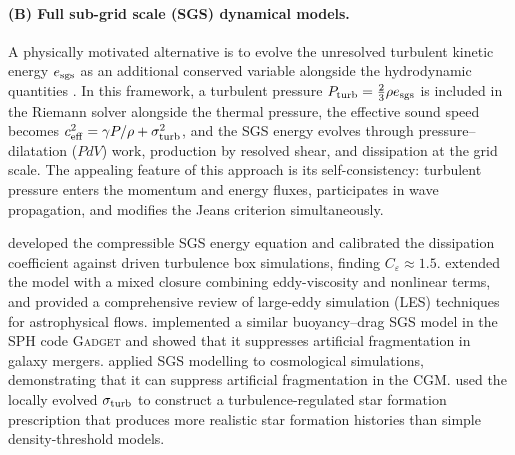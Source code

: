 \documentclass[fleqn,usenatbib]{mnras}
\begin{document}
\paragraph{(B) Full sub-grid scale (SGS) dynamical models.}
A physically motivated alternative is to evolve the unresolved
turbulent kinetic energy $e_{\rm sgs}$ as an additional conserved
variable alongside the hydrodynamic quantities
\citep{Schmidt2006, Schmidt2011, Scannapieco2008}.  In this
framework, a turbulent pressure $P_{\rm turb} = \frac{2}{3}\rho
e_{\rm sgs}$ is included in the Riemann solver alongside the thermal
pressure, the effective sound speed becomes $c_{\rm eff}^2 =
\gamma P/\rho + \sigma_{\rm turb}^2$, and the SGS energy evolves
through pressure--dilatation ($PdV$) work, production by resolved
shear, and dissipation at the grid scale.  The appealing feature of
this approach is its self-consistency: turbulent pressure enters the
momentum and energy fluxes, participates in wave propagation, and
modifies the Jeans criterion simultaneously.

\citet{Schmidt2006} developed the compressible SGS energy equation
and calibrated the dissipation coefficient against driven turbulence
box simulations, finding $C_\varepsilon \approx 1.5$.
\citet{Schmidt2011} extended the model with a mixed closure combining
eddy-viscosity and nonlinear terms, and
\citet{SchmidtBruckner2025} provided a comprehensive review of
large-eddy simulation (LES) techniques for astrophysical flows.
\citet{Scannapieco2008} implemented a similar buoyancy--drag SGS
model in the SPH code \textsc{Gadget} and showed that it suppresses
artificial fragmentation in galaxy mergers.
\citet{Rennehan2021} applied SGS modelling to cosmological
simulations, demonstrating that it can suppress artificial
fragmentation in the CGM.  \citet{Semenov2016} used the locally
evolved $\sigma_{\rm turb}$ to construct a turbulence-regulated
star formation prescription that produces more realistic star
formation histories than simple density-threshold models.
\end{document}
